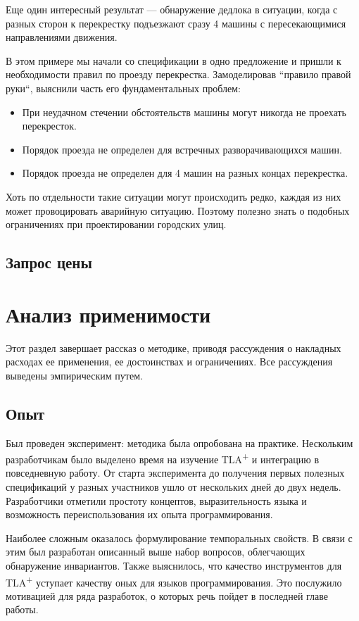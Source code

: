 \documentclass[14pt, openany]{book}
\newcommand{\tlapl}{TLA\textsuperscript{+} }
\begin{document}
Еще один интересный результат --- обнаружение дедлока в ситуации, когда с разных сторон к перекрестку подъезжают сразу 4 машины с пересекающимися направлениями движения.

В этом примере мы начали со спецификации в одно предложение и пришли к необходимости правил по проезду перекрестка. Замоделировав ``правило правой руки``, выяснили часть его фундаментальных проблем:
\begin{itemize}
  \item При неудачном стечении обстоятельств машины могут никогда не проехать перекресток.
  \item Порядок проезда не определен для встречных разворачивающихся машин. 
  \item Порядок проезда не определен для 4 машин на разных концах перекрестка.
\end{itemize}

Хоть по отдельности такие ситуации могут происходить редко, каждая из них может провоцировать аварийную ситуацию. Поэтому полезно знать о подобных ограничениях при проектировании городских улиц.

\subsection{Запрос цены}

\section{Анализ применимости}
Этот раздел завершает рассказ о методике, приводя рассуждения о накладных расходах ее применения, ее достоинствах и ограничениях.
Все рассуждения выведены эмпирическим путем.

\subsection{Опыт}
Был проведен эксперимент: методика была опробована на практике. Нескольким разработчикам было выделено время на изучение \tlapl и интеграцию в повседневную работу. От старта эксперимента до получения первых полезных спецификаций у разных участников ушло от нескольких дней до двух недель. Разработчики отметили простоту концептов, выразительность языка и возможность переиспользования их опыта программирования. 

Наиболее сложным оказалось формулирование темпоральных свойств. В связи с этим был разработан описанный выше набор вопросов, облегчающих обнаружение инвариантов. Также выяснилось, что качество инструментов для \tlapl уступает качеству оных для языков программирования. Это послужило мотивацией для ряда разработок, о которых речь пойдет в последней главе работы.
\end{document}
